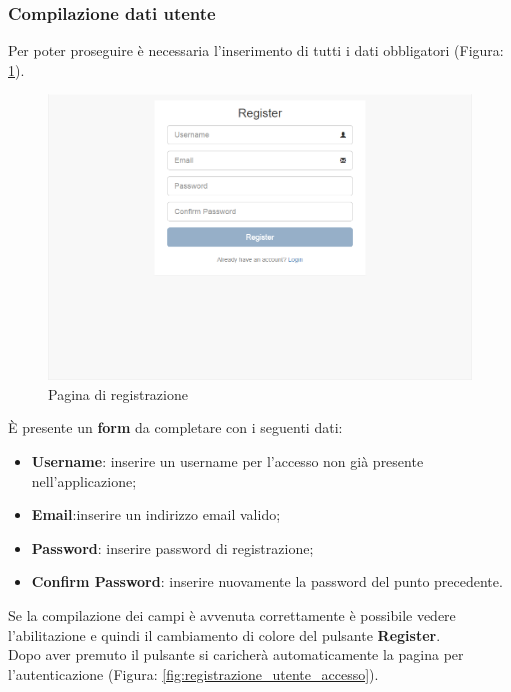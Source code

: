 		\pagebreak
		\subsubsection{Compilazione dati utente} %
		\label{sec:compilazioni_dati_utente}
			Per poter proseguire è necessaria l'inserimento di tutti i dati obbligatori (Figura: \ref{fig:pagina_di_registrazione}).
			\begin{figure}[H]
				\centering
				\centerline{\includegraphics[width=14cm]{images/registrazione_utente.png}}
				\caption{Pagina di registrazione}
				\label{fig:pagina_di_registrazione}
			\end{figure}
			È presente un \textbf{form}\gloss{} da completare con i seguenti dati:
			\begin{itemize}
				\item \textbf{Username}: inserire un username per l'accesso non già presente nell'applicazione;
				\item \textbf{Email}:inserire un indirizzo email valido;
				\item \textbf{Password}: inserire password di registrazione;
				\item \textbf{Confirm Password}: inserire nuovamente la password del punto precedente.
			\end{itemize}
			Se la compilazione dei campi è avvenuta correttamente è possibile vedere l'abilitazione e quindi il cambiamento di colore del pulsante \textbf{Register}.\\
			Dopo aver premuto il pulsante si caricherà automaticamente la pagina per l'autenticazione\gloss{} (Figura: \ref{fig:registrazione_utente_accesso}).

